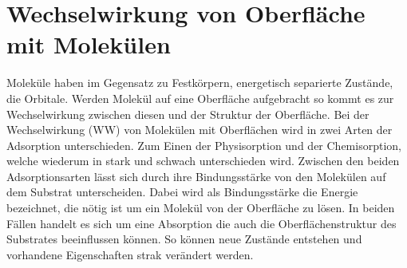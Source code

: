     \section{Wechselwirkung von Oberfläche mit Molekülen}
        Moleküle haben im Gegensatz zu Festkörpern, energetisch separierte Zustände, die Orbitale.
        Werden Molekül auf eine Oberfläche aufgebracht so kommt es zur Wechselwirkung zwischen diesen und der Struktur der Oberfläche.
        Bei der Wechselwirkung (WW) von Molekülen mit Oberflächen wird in zwei Arten der Adsorption unterschieden. 
        Zum Einen der Physisorption und der Chemisorption, welche wiederum in stark und schwach unterschieden wird.
        Zwischen den beiden Adsorptionsarten lässt sich durch ihre Bindungsstärke von den Molekülen auf dem Substrat unterscheiden.
        Dabei wird als Bindungsstärke die Energie bezeichnet, die nötig ist um ein Molekül von der Oberfläche zu lösen.
        In beiden Fällen handelt es sich um eine Absorption die auch die Oberflächenstruktur des Substrates beeinflussen können.
        So können neue Zustände entstehen und vorhandene Eigenschaften strak verändert werden.
        
        
